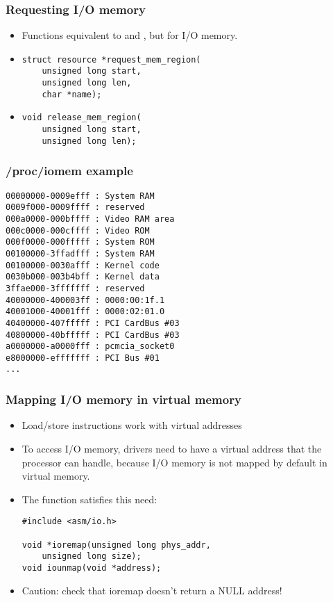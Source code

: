 \begin{frame}[fragile]
  \frametitle{Requesting I/O memory}
  \begin{itemize}
  \item Functions equivalent to  and
    , but for I/O memory.
  \item
\begin{verbatim}
struct resource *request_mem_region(
    unsigned long start,
    unsigned long len,
    char *name);
\end{verbatim}
  \item
\begin{verbatim}
void release_mem_region(
    unsigned long start,
    unsigned long len);
  \end{verbatim}
\end{itemize}
\end{frame}

\begin{frame}[fragile]
  \frametitle{/proc/iomem example}
{\small
\begin{verbatim}
00000000-0009efff : System RAM
0009f000-0009ffff : reserved
000a0000-000bffff : Video RAM area
000c0000-000cffff : Video ROM
000f0000-000fffff : System ROM
00100000-3ffadfff : System RAM
00100000-0030afff : Kernel code
0030b000-003b4bff : Kernel data
3ffae000-3fffffff : reserved
40000000-400003ff : 0000:00:1f.1
40001000-40001fff : 0000:02:01.0
40400000-407fffff : PCI CardBus #03
40800000-40bfffff : PCI CardBus #03
a0000000-a0000fff : pcmcia_socket0
e8000000-efffffff : PCI Bus #01
...
\end{verbatim}
}
\end{frame}

\begin{frame}[fragile]
  \frametitle{Mapping I/O memory in virtual memory}
  \begin{itemize}
  \item Load/store instructions work with virtual addresses
  \item To access I/O memory, drivers need to have a virtual address
    that the processor can handle, because I/O memory is not mapped by
    default in virtual memory.
  \item The  function satisfies this need:
\begin{verbatim}
#include <asm/io.h>

void *ioremap(unsigned long phys_addr,
    unsigned long size);
void iounmap(void *address);
\end{verbatim}
  \item Caution: check that ioremap doesn't return a NULL address!
  \end{itemize}
\end{frame}

